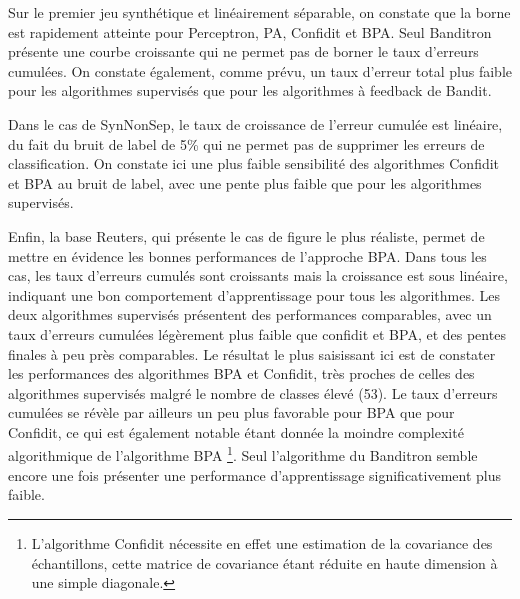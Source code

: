 \documentclass[preprint,12pt,authoryear]{elsarticle}
\begin{document}
Sur le premier jeu synthétique et linéairement séparable, on constate que la borne est rapidement atteinte pour Perceptron, PA, Confidit et BPA. Seul Banditron présente une courbe croissante qui ne permet pas de borner le taux d'erreurs cumulées.  On constate également, comme prévu, un taux d'erreur total plus faible pour les algorithmes supervisés que pour les algorithmes à feedback de Bandit.

Dans le cas de SynNonSep, le taux de croissance de l'erreur cumulée est linéaire, du fait du bruit de label de 5\% qui ne permet pas de supprimer les erreurs de classification. On constate ici une plus faible sensibilité des algorithmes Confidit et BPA au bruit de label, avec une pente plus faible que pour les algorithmes supervisés.


Enfin, la base Reuters, qui présente le cas de figure le plus réaliste, permet de mettre en évidence les bonnes performances de l'approche BPA. Dans tous les cas, les taux d'erreurs cumulés sont croissants mais la croissance est sous linéaire, indiquant une bon comportement d'apprentissage pour tous les algorithmes. Les deux algorithmes supervisés présentent des performances comparables, avec un taux d'erreurs cumulées légèrement plus faible  que confidit et BPA, et des pentes finales à peu près comparables. Le résultat le plus saisissant ici est de constater les performances des algorithmes BPA et Confidit, très proches de celles des algorithmes supervisés malgré le nombre de classes élevé (53). Le taux d'erreurs cumulées se révèle par ailleurs un peu plus favorable pour BPA que pour Confidit, ce qui est également notable étant donnée la moindre complexité algorithmique de l'algorithme BPA \footnote{L'algorithme Confidit nécessite en effet une estimation de la covariance des échantillons, cette matrice de covariance étant réduite en haute dimension à une simple diagonale.}. Seul l'algorithme du Banditron semble encore une fois présenter une performance d'apprentissage significativement plus faible. 
\end{document}
